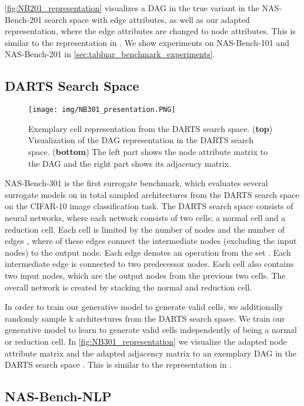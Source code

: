 \documentclass[runningheads]{llncs}
\begin{document}
\autoref{fig:NB201_representation} visualizes a DAG in the true variant in the NAS-Bench-201 search space with edge attributes, as well as our adapted representation, where the edge attributes are changed to node attributes. This is similar to the representation in \cite{2020Arch2vec}.
We show experiments on NAS-Bench-101 and NAS-Bench-201 in \autoref{sec:tabluar_benchmark_experiments}.

\subsection{DARTS Search Space}
\begin{figure*}
	\centering
	\texttt{[image: img/NB301\_presentation.PNG]}
	\caption{Exemplary cell representation from the DARTS search space. (\textbf{top}) Visualization of the DAG representation in the DARTS search space. (\textbf{bottom}) The left part shows the node attribute matrix to the DAG and the right part shows its adjacency matrix. \label{fig:NB301_representation}}
\end{figure*}
NAS-Bench-301 \cite{2020NB301} is the first surrogate benchmark, which evaluates several surrogate models on in total  sampled architectures from the DARTS \cite{2018DARTS} search space on the CIFAR-10 \cite{2009CIFAR}
image classification task. 
The DARTS search space consists of  neural networks, where each network consists of two cells; a normal cell and a reduction cell.  Each cell is limited by the number of nodes  and the number of edges , where  of these edges connect the intermediate nodes (excluding the input nodes) to the output node. Each edge denotes an operation from the set  . Each intermediate edge is connected to two predecessor nodes. Each cell also contains two input nodes, which are the output nodes from the previous two cells. The overall network is created by stacking the normal and reduction cell.

In order to train our generative model to generate valid cells, we additionally randomly sample k architectures from the DARTS search space. 
We train our generative model to learn to generate valid cells independently of being a normal or reduction cell. 
In \autoref{fig:NB301_representation} we visualize the adapted node attribute matrix and the adapted adjacency matrix to an exemplary DAG in the DARTS search space \cite{2018DARTS}. This is similar to the representation in \cite{2020Arch2vec}.

\subsection{NAS-Bench-NLP}\label{sec:supp_rep_nbnlp}
\end{document}

